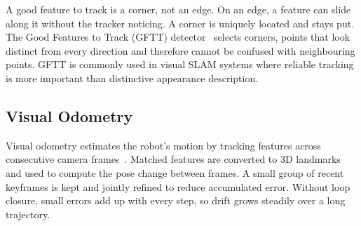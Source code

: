 A good feature to track is a corner, not an edge.
On an edge, a feature can slide along it without the tracker noticing.
A corner is uniquely located and stays put.
The Good Features to Track (GFTT) detector~\cite{shi1994good} selects corners,
points that look distinct from every direction and therefore cannot be
confused with neighbouring points.
GFTT is commonly used in visual SLAM systems where reliable tracking is
more important than distinctive appearance description.


\subsection{Visual Odometry}

Visual odometry estimates the robot's motion by tracking features across
consecutive camera frames~\cite{scaramuzza2011visual}.
Matched features are converted to 3D landmarks and used to compute the pose
change between frames.
A small group of recent keyframes is kept and jointly refined to reduce
accumulated error.
Without loop closure, small errors add up with every step, so drift grows
steadily over a long trajectory.

